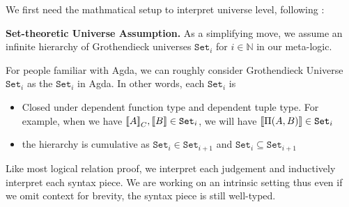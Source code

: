 We first need the mathmatical setup to interpret universe level, following \citet{sterling2019algebraic}:

\newcommand{\Set}[1]{\ensuremath{\texttt{Set}_{#1}}}

{\textbf{Set-theoretic Universe Assumption.}} As a simplifying move, we assume an infinite hierarchy of Grothendieck universes $\Set{i}$ for $i \in \mathbb{N}$ in our meta-logic.

For people familiar with Agda, we can roughly consider Grothendieck Universe $\Set{i}$ as the $\Set{i}$ in Agda. In other words, each $\Set{i}$ is 
\begin{itemize}
  \item Closed under dependent function type and dependent tuple type. For example, when we have $\denotesC{A}, \denotes{B} \in \Set{i}$, we will have $\denotes{\TyPi{A}{B}} \in \Set{i}$
  \item the hierarchy is cumulative as $\Set{i} \in \Set{i+1}$ and $\Set{i} \subseteq \Set{i+1}$
\end{itemize}


Like most logical relation proof,  we interpret each judgement and inductively interpret each syntax piece. We are working on an intrinsic setting thus even if we omit context for brevity, the syntax piece is still well-typed. 

